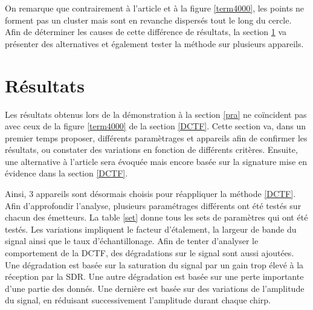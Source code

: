 On remarque que contrairement à l'article et à la figure \ref{term4000}, les points ne forment pas un cluster mais sont en revanche dispersés tout le long du cercle. Afin de déterminer les causes de cette différence de résultats, la section \ref{result} va présenter des alternatives et également tester la méthode sur plusieurs appareils.

\section{Résultats}\label{result}

Les résultats obtenus lors de la démonstration à la section  \ref{pra} ne coïncident pas avec ceux de la figure \ref{term4000} de la section \ref{DCTF}. Cette section va, dans un premier temps proposer, différents paramètrages et appareils afin de confirmer les résultats, ou constater des variations en fonction de différents critères. Ensuite, une alternative à l'article sera évoquée mais encore basée sur la signature mise en évidence dans la section \ref{DCTF}. 

Ainsi, 3 appareils sont désormais choisis pour réappliquer la méthode \ref{DCTF}. Afin d'approfondir l'analyse, plusieurs paramétrages différents ont été testés sur chacun des émetteurs. La table \ref{set} donne tous les sets de paramètres qui ont été testés. Les variations impliquent le facteur d'étalement, la largeur de bande du signal ainsi que le taux d'échantillonage. Afin de tenter d'analyser le comportement de la \ac{DCTF}, des dégradations sur le signal sont aussi ajoutées. Une dégradation est basée sur la saturation du signal par un gain trop élevé à la réception par la \ac{SDR}. Une autre dégradation est basée sur une perte importante d'une partie des donnés. Une dernière est basée sur des variations  de l'amplitude du signal, en réduisant successivement l'amplitude durant chaque chirp.

